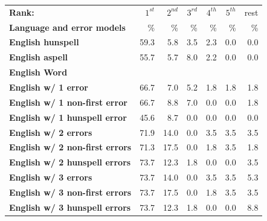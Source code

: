 \documentclass[a4paper,12pt]{article}
\begin{document}
\begin{table}
    \centering
    \begin{tabular}{|l|r|r|r|r|r|r|}
        \hline
        \bf Rank: & $1^{st}$ & $2^{nd}$ & $3^{rd}$ & $4^{th}$ & $5^{th}$ & rest \\
        \bf Language and error models &  \% & \% & \% & \% & \% & \% \\
        \hline
        \bf English hunspell & 59.3 & 5.8 & 3.5 & 2.3 & 0.0 & 0.0 \\
          \bf English aspell & 55.7 & 5.7 & 8.0 & 2.2 & 0.0 & 0.0 \\
            \bf English Word & & & & & &  \\
        \hline
        \bf English w/ 1 error     & 66.7 & 7.0  & 5.2 & 1.8 & 1.8 & 1.8 \\
 \bf English w/ 1 non-first error  & 66.7 & 8.8  & 7.0 & 0.0 & 0.0 & 1.8 \\
 \bf English w/ 1 hunspell error   & 45.6 & 8.7  & 0.0 & 0.0 & 0.0 & 0.0 \\
     \bf English w/ 2 errors       & 71.9 & 14.0 & 0.0 & 3.5 & 3.5 & 3.5 \\
 \bf English w/ 2 non-first errors & 71.3 & 17.5 & 0.0 & 1.8 & 3.5 & 1.8 \\
 \bf English w/ 2 hunspell errors  & 73.7 & 12.3 & 1.8 & 0.0 & 0.0 & 3.5 \\
   \bf English w/ 3 errors         & 73.7 & 14.0 & 0.0 & 3.5 & 3.5 & 5.3 \\
 \bf English w/ 3 non-first errors & 73.7 & 17.5 & 0.0 & 1.8 & 3.5 & 3.5 \\
 \bf English w/ 3 hunspell errors  & 73.7 & 12.3 & 1.8 & 0.0 & 0.0 & 8.8 \\
        \hline

\end{tabular}
\end{table}
\end{document}
